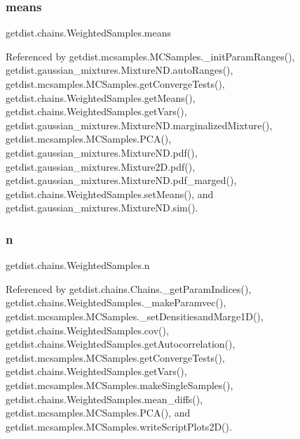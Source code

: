 \subsubsection{\texorpdfstring{means}{means}}
{\footnotesize\ttfamily getdist.\+chains.\+Weighted\+Samples.\+means}



Referenced by getdist.\+mcsamples.\+M\+C\+Samples.\+\_\+init\+Param\+Ranges(), getdist.\+gaussian\+\_\+mixtures.\+Mixture\+N\+D.\+auto\+Ranges(), getdist.\+mcsamples.\+M\+C\+Samples.\+get\+Converge\+Tests(), getdist.\+chains.\+Weighted\+Samples.\+get\+Means(), getdist.\+chains.\+Weighted\+Samples.\+get\+Vars(), getdist.\+gaussian\+\_\+mixtures.\+Mixture\+N\+D.\+marginalized\+Mixture(), getdist.\+mcsamples.\+M\+C\+Samples.\+P\+C\+A(), getdist.\+gaussian\+\_\+mixtures.\+Mixture\+N\+D.\+pdf(), getdist.\+gaussian\+\_\+mixtures.\+Mixture2\+D.\+pdf(), getdist.\+gaussian\+\_\+mixtures.\+Mixture\+N\+D.\+pdf\+\_\+marged(), getdist.\+chains.\+Weighted\+Samples.\+set\+Means(), and getdist.\+gaussian\+\_\+mixtures.\+Mixture\+N\+D.\+sim().

\mbox{\label{classgetdist_1_1chains_1_1WeightedSamples_a4343f22364965b552f30d4c63396ffdb}} 
\subsubsection{\texorpdfstring{n}{n}}
{\footnotesize\ttfamily getdist.\+chains.\+Weighted\+Samples.\+n}



Referenced by getdist.\+chains.\+Chains.\+\_\+get\+Param\+Indices(), getdist.\+chains.\+Weighted\+Samples.\+\_\+make\+Paramvec(), getdist.\+mcsamples.\+M\+C\+Samples.\+\_\+set\+Densitiesand\+Marge1\+D(), getdist.\+chains.\+Weighted\+Samples.\+cov(), getdist.\+chains.\+Weighted\+Samples.\+get\+Autocorrelation(), getdist.\+mcsamples.\+M\+C\+Samples.\+get\+Converge\+Tests(), getdist.\+chains.\+Weighted\+Samples.\+get\+Vars(), getdist.\+mcsamples.\+M\+C\+Samples.\+make\+Single\+Samples(), getdist.\+chains.\+Weighted\+Samples.\+mean\+\_\+diffs(), getdist.\+mcsamples.\+M\+C\+Samples.\+P\+C\+A(), and getdist.\+mcsamples.\+M\+C\+Samples.\+write\+Script\+Plots2\+D().

\mbox{\label{classgetdist_1_1chains_1_1WeightedSamples_ad33b233c472608ada6a0fe5d8e241aac}} 
